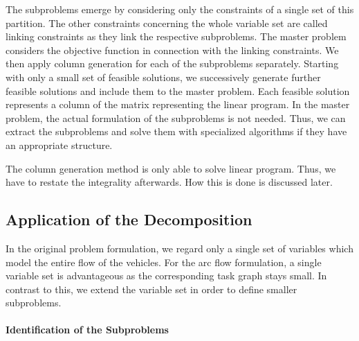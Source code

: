 The subproblems emerge by considering only the constraints of a single set of this partition. The other constraints concerning the whole variable set are called linking constraints as they link the respective subproblems. The master problem considers the objective function in connection with the linking constraints. We then apply column generation for each of the subproblems separately. Starting with only a small set of feasible solutions, we successively generate further feasible solutions and include them to the master problem. Each feasible solution represents a column of the matrix representing the linear program. In the master problem, the actual formulation of the subproblems is not needed. Thus, we can extract the subproblems and solve them with specialized algorithms if they have an appropriate structure.

The column generation method is only able to solve linear program. Thus, we have to restate the integrality afterwards. How this is done is discussed later.


\subsection{Application of the Decomposition}

In the original problem formulation, we regard only a single set of variables which model the entire flow of the vehicles. For the arc flow formulation, a single variable set is advantageous as the corresponding task graph stays small. In contrast to this, we extend the variable set in order to define smaller subproblems.

\paragraph{Identification of the Subproblems} \parfill

